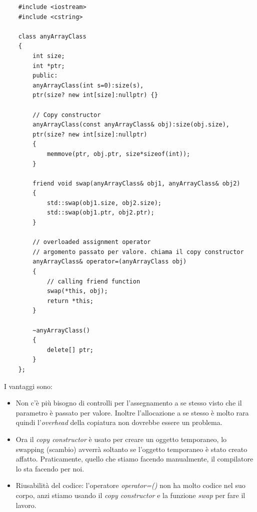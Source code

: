 \begin{lstlisting}
	#include <iostream>
	#include <cstring>
	
	class anyArrayClass
	{
		int size;
		int *ptr;
		public:
		anyArrayClass(int s=0):size(s),
		ptr(size? new int[size]:nullptr) {}
		
		// Copy constructor
		anyArrayClass(const anyArrayClass& obj):size(obj.size),
		ptr(size? new int[size]:nullptr)
		{
			memmove(ptr, obj.ptr, size*sizeof(int));
		}
		
		friend void swap(anyArrayClass& obj1, anyArrayClass& obj2)
		{
			std::swap(obj1.size, obj2.size);
			std::swap(obj1.ptr, obj2.ptr);
		}
		
		// overloaded assignment operator
		// argomento passato per valore. chiama il copy constructor
		anyArrayClass& operator=(anyArrayClass obj)	
		{
			// calling friend function
			swap(*this, obj);
			return *this;
		}
		
		~anyArrayClass()
		{
			delete[] ptr;
		}
	};
\end{lstlisting}

\textsf{\small I vantaggi sono: } \\

\begin{itemize} %
	\item \textsf{\small Non c'è più bisogno di controlli per l'assegnamento a se stesso visto che il parametro è passato per valore. Inoltre l'allocazione a se stesso è molto rara quindi l'\emph{overhead} della copiatura non dovrebbe essere un problema.}
	\item \textsf{\small Ora il \emph{copy constructor} è usato per creare un oggetto temporaneo, lo swapping (scambio) avverrà soltanto se l'oggetto temporaneo è stato creato affatto. Praticamente, quello che stiamo facendo manualmente, il compilatore lo sta facendo per noi.}
	\item \textsf{\small Riusabilità del codice: l'operatore \emph{operator=()} non ha molto codice nel suo corpo, anzi stiamo usando il \emph{copy constructor} e la funzione \emph{swap} per fare il lavoro.}
\end{itemize}



